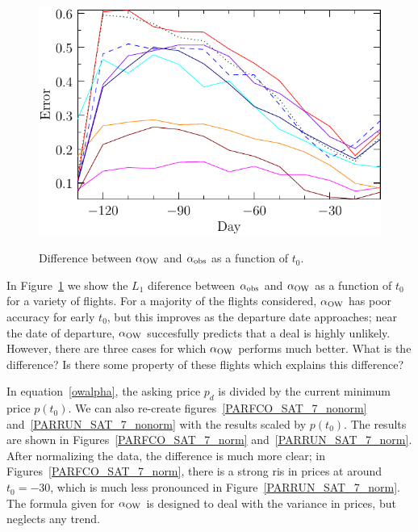\documentclass{article}
\def\aow{\alpha_{\rm{OW}}}
\def\aobs{\alpha_{\rm{obs}}}
\begin{document}
\begin{figure}
  \begin{center}
    \includegraphics{pdf/plotA0}
    \label{plotA0}
    \caption{Difference between $\alpha_{\rm{OW}}$ and
      $\alpha_{\rm{obs}}$ as a function of $t_0$.}
  \end{center}
\end{figure}

In Figure~\ref{plotA0} we show the $L_1$ diference between $\aobs$ and
$\aow$ as a function of $t_0$ for a variety of flights.  For a
majority of the flights considered, $\aow$ has poor accuracy for early
$t_0$, but this improves as the departure date approaches; near the
date of departure, $\aow$ succesfully predicts that a deal is highly
unlikely.  However, there are three cases for which $\aow$ performs
much better.  What is the difference?  Is there some property of these
flights which explains this difference?

In equation~\eqref{owalpha}, the asking price $p_d$ is divided by the
current minimum price $p(t_0)$.  We can also re-create
figures~\ref{PARFCO_SAT_7_nonorm} and~\ref{PARRUN_SAT_7_nonorm} with
the results scaled by $p(t_0)$.  The results are shown in
Figures~\ref{PARFCO_SAT_7_norm} and~\ref{PARRUN_SAT_7_norm}.  After
normalizing the data, the difference is much more clear; in
Figures~\ref{PARFCO_SAT_7_norm}, there is a strong ris in prices at
around $t_0=-30$, which is much less pronounced in
Figure~\ref{PARRUN_SAT_7_norm}.  The formula given for $\aow$ is
designed to deal with the variance in prices, but neglects any trend.
\end{document}
